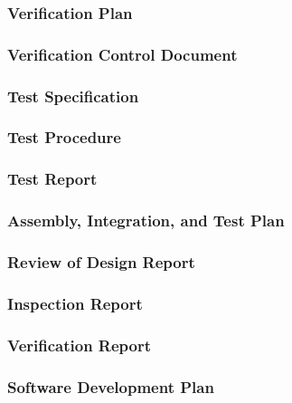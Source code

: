 \subsubsection{Verification Plan}
\label{app:Verification Plan}

\subsubsection{Verification Control Document}
\label{app:Verification Control Document}

\subsubsection{Test Specification}
\label{app:Test Specification}

\subsubsection{Test Procedure}
\label{app:Test Procedure}

\subsubsection{Test Report}
\label{app:Test Report}

\subsubsection{Assembly, Integration, and Test Plan}
\label{app:Assembly, Integration, and Test Plan}

\subsubsection{Review of Design Report}
\label{app:Review of Design Report}

\subsubsection{Inspection Report}
\label{app:Inspection Report}

\subsubsection{Verification Report}
\label{app:Verification Report}

\subsubsection{Software Development Plan}
\label{app:Software Development Plan}

